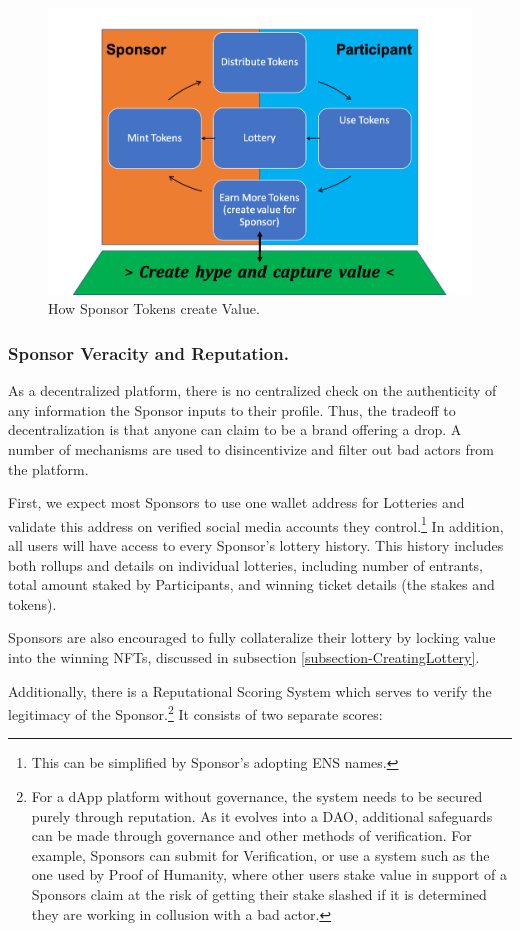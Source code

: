 \documentclass[runningheads]{llncs}
\begin{document}
\begin{figure}[H]
\centering
\includegraphics[scale=0.5]{Figures_and_Tables/Token_Value.png}
\caption{How Sponsor Tokens create Value.}
\end{figure}

\subsubsection{Sponsor Veracity and Reputation.}  As a decentralized platform, there is no centralized check on the authenticity of any information the Sponsor inputs to their profile.  Thus, the tradeoff to decentralization is that anyone can claim to be a brand offering a drop.  A number of mechanisms are used to disincentivize and filter out bad actors from the platform.

First, we expect most Sponsors to use one wallet address for Lotteries and validate this address on verified social media accounts they control.\footnote{This can be simplified by Sponsor’s adopting ENS names.}   In addition, all users will have access to every Sponsor’s lottery history.  This history includes both rollups and details on individual lotteries, including number of entrants, total amount staked by Participants, and winning ticket details (the stakes and tokens). 

Sponsors are also encouraged to fully collateralize their lottery by locking value into the winning NFTs, discussed in subsection \ref{subsection-CreatingLottery}.

Additionally, there is a Reputational Scoring System which serves to verify the legitimacy of the Sponsor.\footnote{For a dApp platform without governance, the system needs to be secured purely through reputation.  As it evolves into a DAO, additional safeguards can be made through governance and other methods of verification.  For example, Sponsors can submit for Verification, or use a system such as the one used by Proof of Humanity, where other users stake value in support of a Sponsors claim at the risk of getting their stake slashed if it is determined they are working in collusion with a bad actor.}   It consists of two separate scores:
\end{document}
